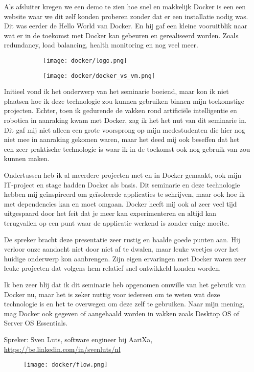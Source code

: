 Als afsluiter kregen we een demo te zien hoe snel en makkelijk Docker is een een website waar we dit zelf konden proberen zonder dat er een installatie nodig was. Dit was eerder de Hello World van Docker. En hij gaf een kleine vooruitblik naar wat er in de toekomst met Docker kan gebeuren en gerealiseerd worden. Zoals redundancy, load balancing, health monitoring en nog veel meer.

\begin{figure}[!h]
  \centering
  \begin{subfigure}[h]{0.37\textwidth}
    \centering
    \texttt{[image: docker/logo.png]}
  \end{subfigure}
  \begin{subfigure}[h]{0.59\textwidth}
    \centering
    \texttt{[image: docker/docker\_vs\_vm.png]}
  \end{subfigure}
\end{figure}

Initieel vond ik het onderwerp van het seminarie boeiend, maar kon ik niet plaatsen hoe ik deze technologie zou kunnen gebruiken binnen mijn toekomstige projecten. Echter, toen ik gedurende de vakken rond artifici\"ele intelligentie en robotica in aanraking kwam met Docker, zag ik het het nut van dit seminarie in. Dit gaf mij niet alleen een grote voorsprong op mijn medestudenten die hier nog niet mee in aanraking gekomen waren, maar het deed mij ook beseffen dat het een zeer praktische technologie is waar ik in de toekomst ook nog gebruik van zou kunnen maken.

Ondertussen heb ik al meerdere projecten met en in Docker gemaakt, ook mijn IT\hyp{}project en stage hadden Docker als basis. Dit seminarie en deze technologie hebben mij ge\"inspireerd om ge\"isoleerde applicaties te schrijven, maar ook hoe ik met dependencies kan en moet omgaan. Docker heeft mij ook al zeer veel tijd uitgespaard door het feit dat je meer kan experimenteren en altijd kan terugvallen op een punt waar de applicatie werkend is zonder enige moeite.

De spreker bracht deze presentatie zeer rustig en haalde goede punten aan. Hij verloor onze aandacht niet door niet af te dwalen, maar leuke weetjes over het huidige onderwerp kon aanbrengen. Zijn eigen ervaringen met Docker waren zeer leuke projecten dat volgens hem relatief snel ontwikkeld konden worden.

Ik ben zeer blij dat ik dit seminarie heb opgenomen omwille van het gebruik van Docker nu, maar het is zeker nuttig voor iedereen om te weten wat deze technologie is en het te overwegen om deze zelf te gebruiken. Naar mijn mening, mag Docker ook gegeven of aangehaald worden in vakken zoals Desktop OS of Server OS Essentials.

Spreker: Sven Luts, software engineer bij AariXa, \url{https://be.linkedin.com/in/svenluts/nl}


\begin{figure}[!h]
  \texttt{[image: docker/flow.png]}
\end{figure}